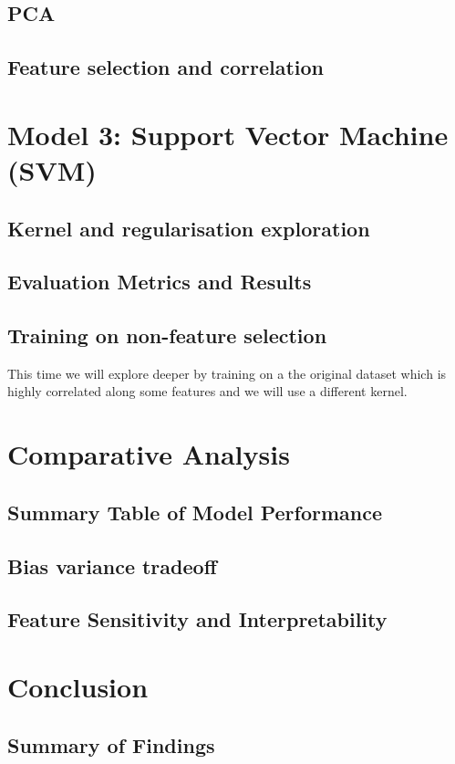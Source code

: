 \documentclass[10pt,twocolumn]{article}
\begin{document}
\subsection{PCA}
\subsection{Feature selection and correlation}

\section{Model 3: Support Vector Machine (SVM)}
\subsection{Kernel and regularisation exploration}
\subsection{Evaluation Metrics and Results}
\subsection{Training on non-feature selection}
This time we will explore deeper by training on a the original dataset which is highly correlated along some features and we will use a different kernel.

\section{Comparative Analysis}
\subsection{Summary Table of Model Performance}

\subsection{Bias variance tradeoff}

\subsection{Feature Sensitivity and Interpretability}


\section{Conclusion}
\subsection{Summary of Findings}
\end{document}
